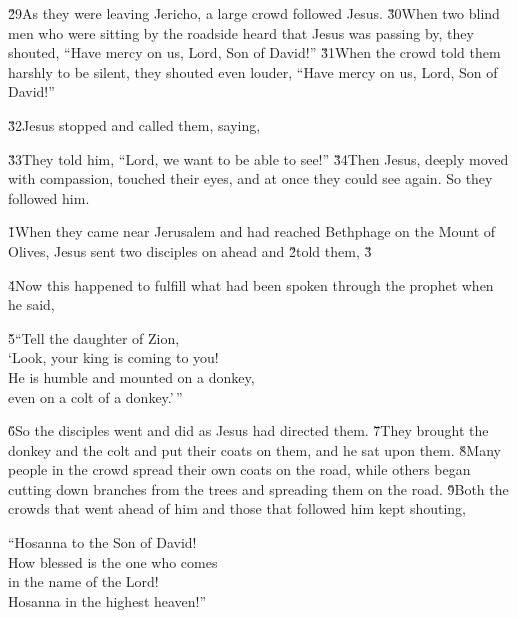 \v{29}As they were leaving Jericho, a large crowd followed Jesus. \v{30}When two blind men who were sitting by the roadside heard that Jesus was passing by, they shouted, ``Have mercy on us, Lord, Son of David!'' \v{31}When the crowd told them harshly to be silent, they shouted even louder, ``Have mercy on us, Lord, Son of David!''

\v{32}Jesus stopped and called them, saying, 

\v{33}They told him, ``Lord, we want to be able to see!'' \v{34}Then Jesus, deeply moved with compassion, touched their eyes, and at once they could see again. So they followed him.

\v{1}When they came near Jerusalem and had reached Bethphage on the Mount of Olives, Jesus sent two disciples on ahead and \v{2}told them,  \v{3}

\v{4}Now this happened to fulfill what had been spoken through the prophet when he said,

\begin{poetry}
\poeml \v{5}``Tell the daughter of Zion, \\
\poemll    `Look, your king is coming to you! \\
\poeml He is humble and mounted on a donkey, \\
\poemll    even on a colt of a donkey.'\,''
\end{poetry}

\v{6}So the disciples went and did as Jesus had directed them. \v{7}They brought the donkey and the colt and put their coats on them, and he sat upon them. \v{8}Many people in the crowd spread their own coats on the road, while others began cutting down branches from the trees and spreading them on the road. \v{9}Both the crowds that went ahead of him and those that followed him kept shouting,

\begin{poetry}
\poeml ``Hosanna to the Son of David! \\
\poeml How blessed is the one who comes \\
\poemll    in the name of the Lord! \\
\poeml Hosanna in the highest heaven!''
\end{poetry}

